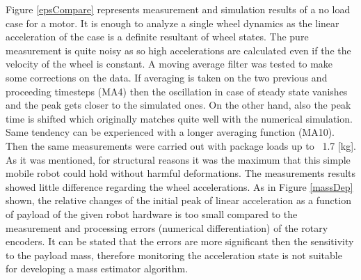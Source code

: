 \documentclass[12pt,english,twoside]{article}
\begin{document}
Figure \ref{epsCompare} represents measurement and simulation results of a no load case for a motor. It is enough to analyze a single wheel dynamics as the linear acceleration of the case is a definite resultant of wheel states. The pure measurement is quite noisy as so high accelerations are calculated even if the the velocity of the wheel is constant. A moving average filter was tested to make some corrections on the data. If averaging is taken on the two previous and proceeding timesteps (MA4) then the oscillation in case of steady state vanishes and the peak gets closer to the simulated ones. On the other hand, also the peak time is shifted which originally matches quite well with the numerical simulation. Same tendency can be experienced with a longer averaging function (MA10). Then the same measurements were carried out with package loads up to ~1.7 [kg]. As it was mentioned, for structural reasons it was the maximum that this simple mobile robot could hold without harmful deformations. The measurements results showed little difference regarding the wheel accelerations. As in Figure \ref{massDep} shown, the relative changes of the initial peak of linear acceleration as a function of payload of the given robot hardware is too small compared to the measurement and processing errors (numerical differentiation) of the rotary encoders. It can be stated that the errors are more significant then the sensitivity to the payload mass, therefore monitoring the acceleration state is not suitable for developing a mass estimator algorithm. 
\end{document}
